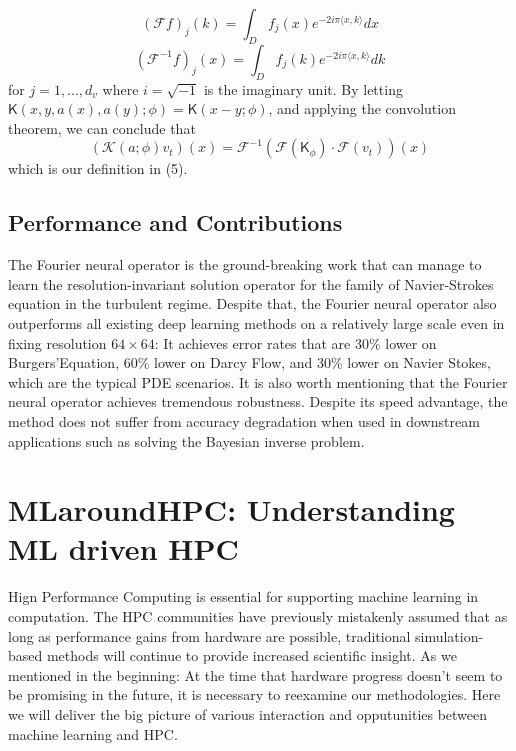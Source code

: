 \documentclass[conference]{IEEEtran}
\begin{document}
$$
\left( \mathcal{F} f \right)_{j} \left( k \right) = \int_{D} f_{j} \left( x \right) e^{-2i\pi \langle x,k \rangle} dx
\label{eq}
$$
$$
\left( \mathcal{F}^{-1} f \right)_{j} \left( x \right) = \int_{D} f_{j} \left( k \right) e^{-2i\pi \langle x,k \rangle} dk
\label{eq}
$$
for $j = 1,...,d_{v}$ where $i = \sqrt{-1}$ is the imaginary unit.
By letting $ \mathsf{K} \left( x,y,a \left( x \right), a \left( y \right); \phi \right) = \mathsf{K} \left( x-y ; \phi \right)$, and applying the convolution theorem, we can conclude that
$$ \left( \mathcal{K} \left( a;\phi \right) v_{t} \right) \left( x \right) = \mathcal{F}^{-1} \left( \mathcal{F} \left( \mathsf{K}_{\phi} \right) \cdot \mathcal{F} \left( v_{t} \right) \right) \left( x \right) $$
which is our definition in (5).

\subsection{Performance and Contributions}
The Fourier neural operator is the ground-breaking work that can manage to learn the resolution-invariant solution operator for the family of Navier-Strokes equation in the turbulent regime. Despite that, the Fourier neural operator also outperforms all existing deep learning methods on a relatively large scale even in fixing resolution $64 \times 64$: It achieves error rates that are 30\% lower on Burgers'Equation, 60\% lower on Darcy Flow, and 30\% lower on Navier Stokes, which are the typical PDE scenarios.
It is also worth mentioning that the Fourier neural operator achieves tremendous robustness. Despite its speed advantage, the method does not suffer from accuracy degradation when used in downstream applications such as solving the Bayesian inverse problem.

\section{MLaroundHPC: Understanding ML driven HPC}
Hign Performance Computing is essential for supporting machine learning in computation. The HPC communities have previously mistakenly assumed that as long as performance gains from hardware are possible, traditional simulation-based methods will continue to provide increased scientific insight. As we mentioned in the beginning: At the time that hardware progress doesn't seem to be promising in the future, it is necessary to reexamine our methodologies. Here we will deliver the big picture of various interaction and opputunities between machine learning and HPC.
\end{document}
